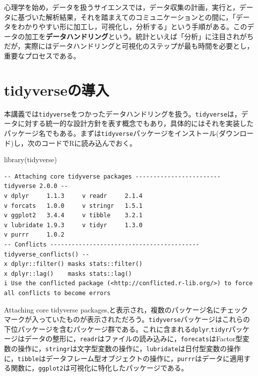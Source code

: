 \documentclass[
  a4paper,
]{ltjsbook}
\newenvironment{Shaded}{\begin{snugshade}}{\end{snugshade}}
\newcommand{\FunctionTok}[1]{\textcolor[rgb]{0.28,0.35,0.67}{#1}}
\newcommand{\NormalTok}[1]{\textcolor[rgb]{0.00,0.23,0.31}{#1}}
\begin{document}
心理学を始め，データを扱うサイエンスでは，データ収集の計画，実行と，データに基づいた解析結果，それを踏まえてのコミュニケーションとの間に，「データをわかりやすい形に加工し，可視化し，分析する」という手順がある。このデータの加工を\textbf{データハンドリング}という。統計といえば「分析」に注目されがちだが，実際にはデータハンドリングと可視化のステップが最も時間を必要とし，重要なプロセスである。

\section{tidyverseの導入}\label{tidyverseux306eux5c0eux5165}

本講義では\texttt{tidyverse}をつかったデータハンドリングを扱う。\texttt{tidyverse}は，データに対する統一的な設計方針を表す概念でもあり，具体的にはそれを実装したパッケージ名でもある。まずは\texttt{tidyverse}パッケージをインストール(ダウンロード)し，次のコードでRに読み込んでおく。

\begin{Shaded}
\begin{Highlighting}[]
\FunctionTok{library}\NormalTok{(tidyverse)}
\end{Highlighting}
\end{Shaded}

\begin{verbatim}
-- Attaching core tidyverse packages ------------------------ tidyverse 2.0.0 --
v dplyr     1.1.3     v readr     2.1.4
v forcats   1.0.0     v stringr   1.5.1
v ggplot2   3.4.4     v tibble    3.2.1
v lubridate 1.9.3     v tidyr     1.3.0
v purrr     1.0.2     
-- Conflicts ------------------------------------------ tidyverse_conflicts() --
x dplyr::filter() masks stats::filter()
x dplyr::lag()    masks stats::lag()
i Use the conflicted package (<http://conflicted.r-lib.org/>) to force all conflicts to become errors
\end{verbatim}

Attaching core tidyverse
packages,と表示され，複数のパッケージ名にチェックマークが入っていたものが表示されただろう。\texttt{tidyverse}パッケージはこれらの下位パッケージを含むパッケージ群である。これに含まれる\texttt{dplyr},\texttt{tidyr}パッケージはデータの整形に，\texttt{readr}はファイルの読み込みに，\texttt{forecats}はFactor型変数の操作に，\texttt{stringr}は文字型変数の操作に，\texttt{lubridate}は日付型変数の操作に，\texttt{tibble}はデータフレーム型オブジェクトの操作に，\texttt{purrr}はデータに適用する関数に，\texttt{ggplot2}は可視化に特化したパッケージである。
\end{document}
